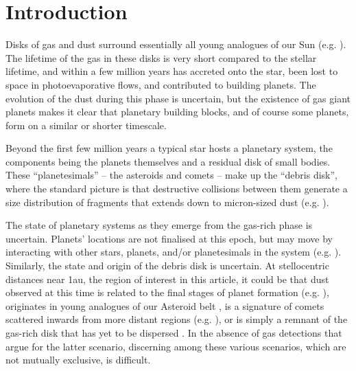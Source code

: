 \documentclass[]{rsos}
\begin{document}
\maketitle

\section{Introduction}\label{s:intro}

Disks of gas and dust surround essentially all young analogues of our Sun
(e.g. \cite{2001ApJ...553L.153H}). The lifetime of the gas in these disks is very short
compared to the stellar lifetime, and within a few million years has accreted onto the
star, been lost to space in photoevaporative flows, and contributed to building
planets. The evolution of the dust during this phase is uncertain, but the existence of
gas giant planets makes it clear that planetary building blocks, and of course some
planets, form on a similar or shorter timescale.

Beyond the first few million years a typical star hosts a planetary system, the
components being the planets themselves and a residual disk of small bodies. These
``planetesimals'' -- the asteroids and comets -- make up the ``debris disk'', where the
standard picture is that destructive collisions between them generate a size distribution
of fragments that extends down to micron-sized dust
(e.g. \cite{1993prpl.conf.1253B,2002MNRAS.334..589W,2010RAA....10..383K}).

The state of planetary systems as they emerge from the gas-rich phase is
uncertain. Planets' locations are not finalised at this epoch, but may move by
interacting with other stars, planets, and/or planetesimals in the system
(e.g. \cite{2007ApJ...669.1298F,1996Sci...274..954R,2005Natur.435..459T}). Similarly, the
state and origin of the debris disk is uncertain. At stellocentric distances near 1au,
the region of interest in this article, it could be that dust observed at this time is
related to the final stages of planet formation
(e.g. \cite{2010ApJ...717L..57M,2012MNRAS.425..657J}), originates in young analogues of
our Asteroid belt \cite{2013MNRAS.433.2334K}, is a signature of comets scattered inwards
from more distant regions (e.g. \cite{2009MNRAS.399..385B}), or is simply a remnant of
the gas-rich disk that has yet to be dispersed \cite{2014MNRAS.438.3299K}. In the absence
of gas detections that argue for the latter scenario, discerning among these various
scenarios, which are not mutually exclusive, is difficult.
\end{document}
